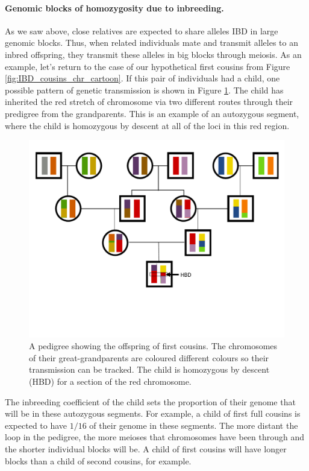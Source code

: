 


  \paragraph{Genomic blocks of homozygosity due to inbreeding.}

As we saw above, close relatives are expected to share alleles IBD in
large genomic blocks. Thus, when related individuals mate and transmit
alleles to an inbred offspring, they transmit these alleles in big
blocks through meiosis. As an example, let's return to the case of our
hypothetical first cousins from Figure
\ref{fig:IBD_cousins_chr_cartoon}. If this pair of individuals had a
child, one possible pattern of genetic transmission is shown in Figure
\ref{fig:kid_first_cousins}. The child has inherited the red stretch
of chromosome via two different routes through their predigree from
the grandparents. This is an example of an autozygous
segment, where the child is homozygous by descent at all of the loci in this
red region.
  \begin{figure}
  \begin{center}
    \includegraphics[width= 0.75 \textwidth]{figures/sharing_relatives/first_cousin_offspring.pdf}
\end{center}
\caption{A pedigree showing the offspring of first cousins. The
  chromosomes of their great-grandparents are coloured different colours
so their transmission can be tracked. The child is homozygous by
descent (HBD) for a section of the red chromosome.} \label{fig:kid_first_cousins}
\end{figure}
The inbreeding coefficient of the child sets the proportion of their
genome that will be in these autozygous segments. For example, a child
of first full cousins is expected to have $1/16$ of their
genome in these segments.
The more distant the loop in the pedigree, the more meioses that
chromosomes have been through and the shorter individual blocks will be. A
child of first cousins will have longer blocks than a child of second
cousins, for example.

